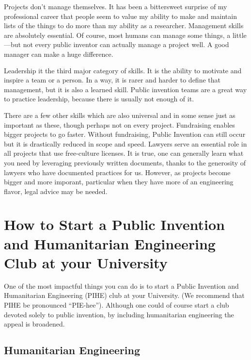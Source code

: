 \documentclass[
	fontsize=10pt, %
	twoside=false, %
	secnumdepth=1, %
]{kaobook}
\begin{document}
Projects don't manage themselves. It has been a bittersweet surprise of my professional career that
people seem to value my ability to make and maintain lists of the things to do more than my ability
as a researcher. Management skills are absolutely essential. Of course, most humans can manage
some things, a little---but not every public inventor can actually manage a project well. A good manager
can make a huge difference.

Leadership it the third major category of skills. It is the ability to motivate and inspire a team
or a person. In a way, it is rarer and harder to define that management, but it is also a learned
skill. Public invention teams are a great way to practice leadership, because there is usually
not enough of it.

There are a few other skills which are also universal and in some sense just as important as these,
though perhaps not on every project. Fundraising enables bigger projects to go faster.
Without fundraising, Public Invention can still occur but it is drastically reduced in scope
and speed. Lawyers serve an essential role in all projects that use free-culture licenses.
It is true, one can generally learn what you need by leveraging previously written documents, thanks to the generosity of
lawyers who have documented practices for us. However, as projects become bigger and more imporant,
particular when they have more of an engineering flavor, legal advice may be needed.

\chapter{How to Start a Public Invention and Humanitarian Engineering Club at your University}

\label{sec:piheclub}


One of the most impactful things you can do is to start a Public Invention and Humanitarian Engineering (PIHE) club at your University.
(We recommend that PIHE be pronounced “PIE-hee”). Although one could of course start a club devoted
solely to public invention, by including humanitarian engineering the appeal is broadened.


\section{Humanitarian Engineering}
\end{document}
